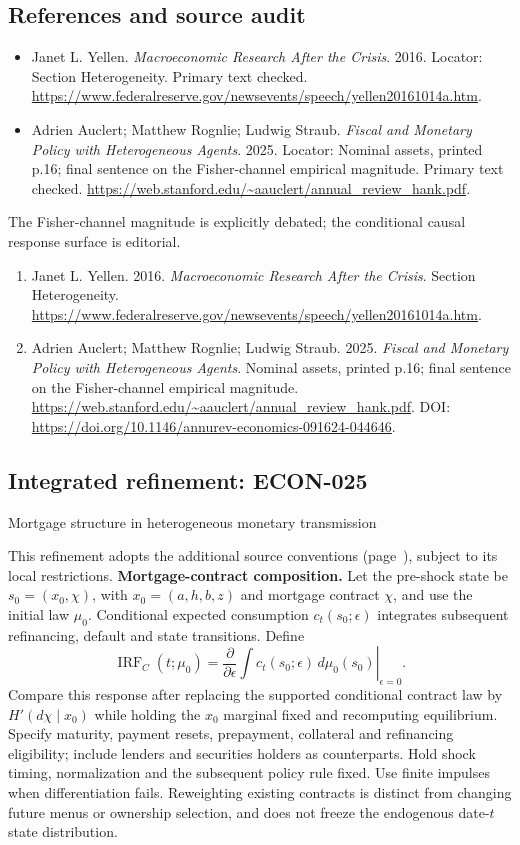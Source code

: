 \documentclass[11pt,a4paper]{article}
\begin{document}
\subsection*{References and source audit}
\begin{itemize}
\item Janet L. Yellen. \emph{Macroeconomic Research After the Crisis}. 2016. Locator: Section Heterogeneity. Primary text checked. \url{https://www.federalreserve.gov/newsevents/speech/yellen20161014a.htm}.
\item Adrien Auclert; Matthew Rognlie; Ludwig Straub. \emph{Fiscal and Monetary Policy with Heterogeneous Agents}. 2025. Locator: Nominal assets, printed p.16; final sentence on the Fisher-channel empirical magnitude. Primary text checked. \url{https://web.stanford.edu/~aauclert/annual_review_hank.pdf}.
\end{itemize}
The Fisher-channel magnitude is explicitly debated; the conditional causal response surface is editorial.
\begin{enumerate}\raggedright
\item\hypertarget{definitions:source:30007525:1}{} Janet L. Yellen. 2016. \emph{Macroeconomic Research After the Crisis}. Section Heterogeneity.
\url{https://www.federalreserve.gov/newsevents/speech/yellen20161014a.htm}.
\item\hypertarget{definitions:source:30007525:2}{} Adrien Auclert; Matthew Rognlie; Ludwig Straub. 2025. \emph{Fiscal and Monetary Policy with Heterogeneous Agents}. Nominal assets, printed p.16; final sentence on the Fisher-channel empirical magnitude.
\url{https://web.stanford.edu/~aauclert/annual_review_hank.pdf}.
DOI: \url{https://doi.org/10.1146/annurev-economics-091624-044646}.
\end{enumerate}

\subsection*{Integrated refinement: ECON-025}
{\sffamily\small\color{muted}Mortgage structure in heterogeneous monetary transmission\par}
This refinement adopts the additional source conventions
(page~\pageref{audited:conventions}), subject to its local restrictions.
\textbf{Mortgage-contract composition.}
Let the pre-shock state be $s_0=(x_0,\chi)$, with
$x_0=(a,h,b,z)$ and mortgage contract $\chi$, and use the initial law $\mu_0$.
Conditional expected consumption $c_t(s_0;\epsilon)$ integrates subsequent
refinancing, default and state transitions. Define
\[
\operatorname{IRF}_C(t;\mu_0)
=\left.\frac{\partial}{\partial\epsilon}
       \int c_t(s_0;\epsilon)\,d\mu_0(s_0)\right|_{\epsilon=0}.
\]
Compare this response after replacing the supported conditional contract law by
$H'(d\chi\mid x_0)$ while holding the $x_0$ marginal fixed and recomputing
equilibrium. Specify maturity, payment resets, prepayment, collateral and
refinancing eligibility; include lenders and securities holders as counterparts.
Hold shock timing, normalization and the subsequent policy rule fixed. Use finite
impulses when differentiation fails. Reweighting existing contracts is distinct
from changing future menus or ownership selection, and does not freeze the
endogenous date-$t$ state distribution.
\end{document}
